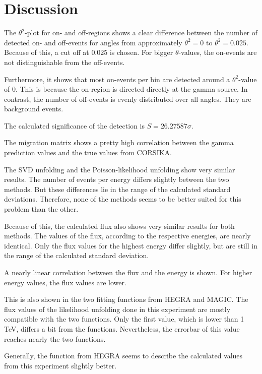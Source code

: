 \section{Discussion}
\label{sec:Diskussion}

The $\theta^2$-plot for on- and off-regions shows a clear difference between the number of detected on- and off-events for angles from approximately $\theta^2 = 0$ to $\theta^2 = 0.025$. Because of this, a cut off at $0.025$ is chosen. For bigger $\theta$-values, the on-events are not distinguishable from the off-events.

Furthermore, it shows that most on-events per bin are detected around a $\theta^2$-value of $0$. This is because the on-region is directed directly at the gamma source. In contrast, the number of off-events is evenly distributed over all angles. They are background events.

The calculated significance of the detection is $S = 26.27587 \sigma$.


The migration matrix shows a pretty high correlation between the gamma prediction values and the true values from CORSIKA.

The SVD unfolding and the Poisson-likelihood unfolding show very similar results. The number of events per energy differs slightly between the two methods. But these differences lie in the range of the calculated standard deviations. Therefore, none of the methods seems to be better suited for this problem than the other.

Because of this, the calculated flux also shows very similar results for both methods. The values of the flux, according to the respective energies, are nearly identical. Only the flux values for the highest energy differ slightly, but are still in the range of the calculated standard deviation.

A nearly linear correlation between the flux and the energy is shown. For higher energy values, the flux values are lower.

This is also shown in the two fitting functions from HEGRA and MAGIC. The flux values of the likelihood unfolding done in this experiment are mostly compatible with the two functions. Only the first value, which is lower than 1 TeV, differs a bit from the functions. Nevertheless, the errorbar of this value reaches nearly the two functions.

Generally, the function from HEGRA seems to describe the calculated values from this experiment slightly better.
